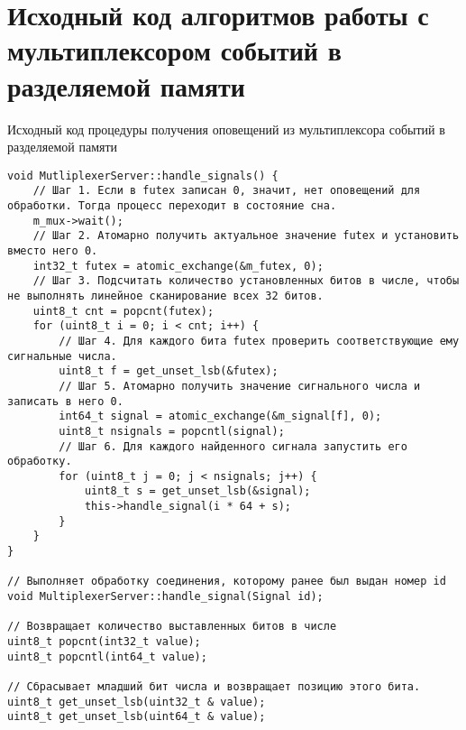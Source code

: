 \chapter{Исходный код алгоритмов работы с мультиплексором событий в разделяемой памяти}\label{sec:app:1}

\begin{algorithm}[!h]
\caption{Исходный код процедуры получения оповещений из мультиплексора событий в разделяемой памяти}
\label{appendix91:ReceiverCode}
\begin{lstlisting}[frame=tlrb]
void MutliplexerServer::handle_signals() {
	// Шаг 1. Если в futex записан 0, значит, нет оповещений для обработки. Тогда процесс переходит в состояние сна.
	m_mux->wait();
	// Шаг 2. Атомарно получить актуальное значение futex и установить вместо него 0.
	int32_t futex = atomic_exchange(&m_futex, 0);
	// Шаг 3. Подсчитать количество установленных битов в числе, чтобы не выполнять линейное сканирование всех 32 битов.
	uint8_t cnt = popcnt(futex);
	for (uint8_t i = 0; i < cnt; i++) {
		// Шаг 4. Для каждого бита futex проверить соответствующие ему сигнальные числа.
		uint8_t f = get_unset_lsb(&futex);
		// Шаг 5. Атомарно получить значение сигнального числа и записать в него 0.
		int64_t signal = atomic_exchange(&m_signal[f], 0);
		uint8_t nsignals = popcntl(signal);
		// Шаг 6. Для каждого найденного сигнала запустить его обработку.
		for (uint8_t j = 0; j < nsignals; j++) {
			uint8_t s = get_unset_lsb(&signal);
			this->handle_signal(i * 64 + s);
		}
	}
}

// Выполняет обработку соединения, которому ранее был выдан номер id
void MultiplexerServer::handle_signal(Signal id);

// Возвращает количество выставленных битов в числе
uint8_t popcnt(int32_t value);
uint8_t popcntl(int64_t value);

// Сбрасывает младший бит числа и возвращает позицию этого бита.
uint8_t get_unset_lsb(uint32_t & value);
uint8_t get_unset_lsb(uint64_t & value);
\end{lstlisting}
\end{algorithm}

